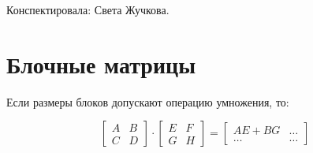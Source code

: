 \documentclass[12pt]{article} %
\theoremstyle{definition} %
\begin{document}
Конспектировала: Света Жучкова.

\section{Блочные матрицы}
Если размеры блоков допускают операцию умножения, то:

\[
\left[
\begin{array}{c|c}
A & B \\
\hline
C & D
\end{array}
\right]
\cdot
\left[
\begin{array}{c|c}
E & F \\
\hline
G & H
\end{array}
\right]
=
\left[
\begin{array}{c|c}
AE + BG &  \ldots\\
\hline
\ldots & \ldots
\end{array}
\right]
\]
\end{document}
